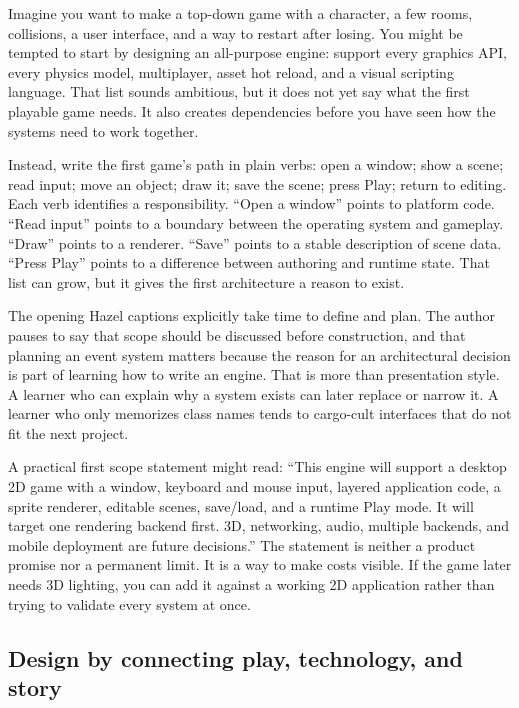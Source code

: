 Imagine you want to make a top-down game with a character, a few rooms, collisions, a user interface, and a way to restart after losing. You might be tempted to start by designing an all-purpose engine: support every graphics API, every physics model, multiplayer, asset hot reload, and a visual scripting language. That list sounds ambitious, but it does not yet say what the first playable game needs. It also creates dependencies before you have seen how the systems need to work together.

Instead, write the first game's path in plain verbs: open a window; show a scene; read input; move an object; draw it; save the scene; press Play; return to editing. Each verb identifies a responsibility. ``Open a window'' points to platform code. ``Read input'' points to a boundary between the operating system and gameplay. ``Draw'' points to a renderer. ``Save'' points to a stable description of scene data. ``Press Play'' points to a difference between authoring and runtime state. That list can grow, but it gives the first architecture a reason to exist.

The opening Hazel captions explicitly take time to define and plan. The author pauses to say that scope should be discussed before construction, and that planning an event system matters because the reason for an architectural decision is part of learning how to write an engine. That is more than presentation style. A learner who can explain why a system exists can later replace or narrow it. A learner who only memorizes class names tends to cargo-cult interfaces that do not fit the next project.

A practical first scope statement might read: ``This engine will support a desktop 2D game with a window, keyboard and mouse input, layered application code, a sprite renderer, editable scenes, save/load, and a runtime Play mode. It will target one rendering backend first. 3D, networking, audio, multiple backends, and mobile deployment are future decisions.'' The statement is neither a product promise nor a permanent limit. It is a way to make costs visible. If the game later needs 3D lighting, you can add it against a working 2D application rather than trying to validate every system at once.

\subsection{Design by connecting play, technology, and story}\label{05-engine-i-ch009-design-by-connecting-play-technology-and-story}

